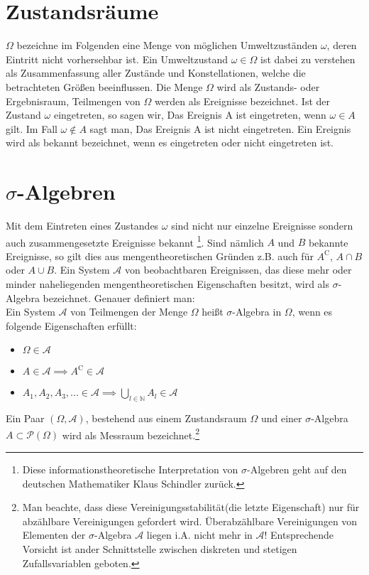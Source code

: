 \documentclass[12pt]{article}
\begin{document}

\section{Zustandsräume}

$\Omega$ bezeichne im Folgenden eine Menge von möglichen Umweltzuständen $\omega$, deren Eintritt
nicht vorhersehbar ist. Ein Umweltzustand $\omega \in \Omega$
 ist dabei zu verstehen als Zusammenfassung
aller Zustände und Konstellationen, welche die betrachteten Größen beeinflussen. Die
Menge $\Omega$ wird als Zustands- oder Ergebnisraum, Teilmengen von $\Omega$ 
 werden als Ereignisse bezeichnet. Ist der Zustand $\omega$ eingetreten, so sagen wir, \glqq Das Ereignis A ist eingetreten\grqq ,
wenn $\omega \in A$ gilt. Im Fall $\omega \notin A$ sagt man, \glqq Das Ereignis A ist nicht eingetreten\grqq . Ein Ereignis
wird als bekannt bezeichnet, wenn es eingetreten oder nicht eingetreten ist.

\section{$\sigma$-Algebren}
Mit dem Eintreten eines Zustandes $\omega$ sind nicht nur einzelne Ereignisse sondern auch zusammengesetzte
Ereignisse bekannt \footnote{Diese informationstheoretische Interpretation von $\sigma$-Algebren geht auf den deutschen Mathematiker Klaus Schindler zurück.}. Sind nämlich $A$ und $B$ bekannte Ereignisse, so gilt dies aus mengentheoretischen Gründen z.B. auch für $A^{\mathrm{C}}$, $A \cap B$ oder $A \cup B$. Ein System $\mathscr{A}$ von
beobachtbaren Ereignissen, das diese mehr oder minder naheliegenden mengentheoretischen
Eigenschaften besitzt, wird als $\sigma$-Algebra bezeichnet. Genauer definiert man: \\

Ein System $\mathscr{A}$ von Teilmengen der Menge $\Omega$ heißt $\sigma$-Algebra in $\Omega$, wenn es folgende
Eigenschaften erfüllt:
\begin{itemize}
\item{$\Omega \in \mathscr{A}$}
\item{$A \in \mathscr{A} \implies A^{\mathrm{C}} \in \mathscr{A}$}
\item{$A_1, A_2, A_3, ... \in \mathscr{A} \implies \bigcup\limits_{l \in \mathbb{N}} A_l \in \mathscr{A}$}
\end{itemize}
Ein Paar $(\Omega, \mathscr{A})$, bestehend aus einem Zustandsraum $\Omega$
 und einer $\sigma$-Algebra $A \subset \mathscr{P}(\Omega)$ wird
als Messraum bezeichnet.\footnote{Man beachte, dass diese \glqq Vereinigungsstabilität\grqq (die letzte Eigenschaft) nur für abzählbare Vereinigungen gefordert wird. Überabzählbare Vereinigungen von Elementen der $\sigma$-Algebra $\mathscr{A}$ liegen i.A. nicht mehr in $\mathscr{A}$! Entsprechende Vorsicht ist ander Schnittstelle zwischen diskreten und stetigen Zufallsvariablen geboten.}
\end{document}

